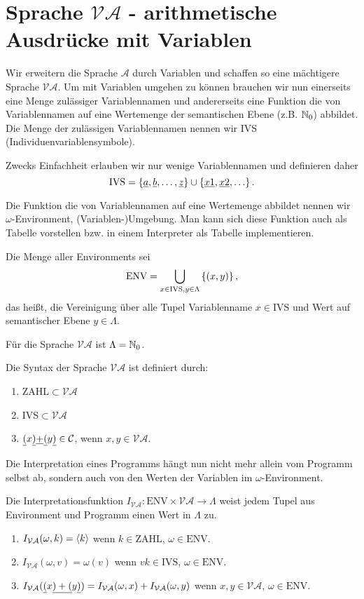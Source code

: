 \section{Sprache $\mathcal{VA}$ - arithmetische Ausdrücke mit Variablen}
Wir erweitern die Sprache $\mathcal{A}$ durch Variablen und schaffen so eine mächtigere Sprache $\mathcal{VA}$.
Um mit Variablen umgehen zu können brauchen wir nun einerseits eine Menge zulässiger
Variablennamen und andererseits eine Funktion die von Variablennamen auf eine Wertemenge der semantischen Ebene (z.B. $\mathbb{N}_0$) abbildet.
Die Menge der zulässigen Variablennamen nennen wir IVS (Individuenvariablensymbole).
\begin{defn}
Zwecks Einfachheit erlauben wir nur wenige Variablennamen und definieren daher
\[\text{IVS} = \left\{\underline{a},\underline{b},\ldots,\underline{z}\right\} \cup \left\{\underline{x1},\underline{x2},\ldots\right\}.\]
\end{defn}
Die Funktion die von Variablennamen auf eine Wertemenge abbildet nennen wir $\omega$-Environment, (Variablen-)Umgebung.
Man kann sich diese Funktion auch als Tabelle vorstellen bzw. in einem Interpreter als Tabelle implementieren.
\begin{defn}
Die Menge aller Environments sei
\[\text{ENV} = \bigcup_{x \in \text{IVS},y \in \Lambda} \left\{(x,y)\right\},\]
das heißt, die Vereinigung über alle Tupel Variablenname $x \in \text{IVS}$ und Wert auf semantischer Ebene $y \in \Lambda$.
\end{defn}
Für die Sprache $\mathcal{VA}$ ist $\Lambda=\mathbb{N}_0$.
\begin{defn}
Die Syntax der Sprache $\mathcal{VA}$ ist definiert durch:
\begin{enumerate}
\item ZAHL$\subset \mathcal{VA}$
\item IVS$\subset \mathcal{VA}$
\item $\underline{(} x \underline{)} \underline{+} \underline{(} y \underline{)} \in \mathcal{C}$, wenn $x,y \in \mathcal{VA}$.
\end{enumerate}
\end{defn}
Die Interpretation eines Programms hängt nun nicht mehr allein vom Programm selbst ab,
sondern auch von den Werten der Variablen im $\omega$-Environment.
\begin{defn}
Die Interpretationsfunktion $I_{\mathcal{VA}}: \text{ENV}\times\mathcal{VA} \to \Lambda$
weist jedem Tupel aus Environment und Programm einen Wert in $\Lambda$ zu.
\begin{enumerate}
\item $I_{\mathcal{VA}}(\omega,k) = \left<k\right>$ wenn $k \in \text{ZAHL}$, $\omega \in \text{ENV}$.
\item $I_{\mathcal{VA}}(\omega,v) = \omega(v)$ wenn $vk \in \text{IVS}$, $\omega \in \text{ENV}$.
\item $I_{\mathcal{VA}}(\underline{(}x\underline{)+(}y\underline{)})=I_{\mathcal{VA}}(\omega,x) + I_{\mathcal{VA}}(\omega,y)$ wenn $x,y \in \mathcal{VA}$, $\omega \in \text{ENV}$.
\end{enumerate}
\end{defn}
